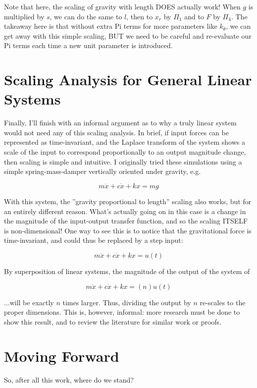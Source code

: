 \documentclass[12pt,letterpaper]{article}
\begin{document}
Note that here, the scaling of gravity with length DOES actually work!
When $g$ is multiplied by $s$, we can do the same to $l$, then to $x_r$ by $\Pi_1$ and to $F$ by $\Pi_4$.
The takeaway here is that without extra Pi terms for more parameters like $k_{\theta}$, we can get away with this simple scaling, BUT we need to be careful and re-evaluate our Pi terms each time a new unit parameter is introduced.

\section{Scaling Analysis for General Linear Systems}

Finally, I'll finish with an informal argument as to why a truly linear system would not need any of this scaling analysis.
In brief, if input forces can be represented as time-invariant, and the Laplace transform of the system shows a scale of the input to correspond proportionally to an output magnitude change, then scaling is simple and intuitive.
I originally tried these simulations using a simple spring-mass-damper vertically oriented under gravity, e.g.

\[
m \ddot x + c \dot x + k x = mg
\]

With this system, the ''gravity proportional to length'' scaling also works, but for an entirely different reason.
What's actually going on in this case is a change in the magnitude of the input-output transfer function, and so the scaling ITSELF is non-dimensional!
One way to see this is to notice that the gravitational force is time-invariant, and could thus be replaced by a step input:

\[
m \ddot x + c \dot x + k x = u(t)
\]

By superposition of linear systems, the magnitude of the output of the system of

\[
m \ddot x + c \dot x + k x = (n) u(t)
\]

...will be exactly $n$ times larger. Thus, dividing the output by $n$ re-scales to the proper dimensions.
This is, however, informal: more research must be done to show this result, and to review the literature for similar work or proofs.

\section{Moving Forward}

So, after all this work, where do we stand? 
\end{document}
